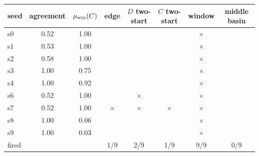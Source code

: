 \begin{tabular}{lccccccc}
\toprule
seed & agreement & $\mu_{\rm win}(C)$ & edge & $D$ two-start & $C$ two-start & window & middle basin \\
\midrule
s0 & 0.52 & 1.00 &  &  &  & $\times$ &  \\
s1 & 0.53 & 1.00 &  &  &  & $\times$ &  \\
s2 & 0.58 & 1.00 &  &  &  & $\times$ &  \\
s3 & 1.00 & 0.75 &  &  &  & $\times$ &  \\
s4 & 1.00 & 0.92 &  &  &  & $\times$ &  \\
s6 & 0.52 & 1.00 &  & $\times$ &  & $\times$ &  \\
s7 & 0.52 & 1.00 & $\times$ & $\times$ & $\times$ & $\times$ &  \\
s8 & 1.00 & 0.06 &  &  &  & $\times$ &  \\
s9 & 1.00 & 0.03 &  &  &  & $\times$ &  \\
\midrule
fired & & & 1/9 & 2/9 & 1/9 & 9/9 & 0/9 \\
\bottomrule
\end{tabular}
